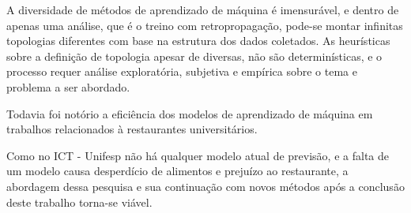 \documentclass[	12pt, Times, openright, twoside, a4paper, english, brazil]{abntex2}
\begin{document}
         A diversidade de métodos de aprendizado de máquina é imensurável, e dentro de apenas uma análise, que é o treino com retropropagação, pode-se montar infinitas topologias diferentes com base na estrutura dos dados coletados. 
        As heurísticas sobre a definição de topologia apesar de diversas, não são determinísticas, e o processo requer análise exploratória, subjetiva e empírica sobre o tema e problema a ser abordado.
        
         Todavia foi notório a eficiência dos modelos de aprendizado de máquina em trabalhos relacionados à restaurantes universitários. 
        
         Como no ICT - Unifesp não há qualquer modelo atual de previsão, e a falta de um modelo causa desperdício de alimentos e prejuízo ao restaurante, a abordagem dessa pesquisa e sua continuação com novos métodos após a conclusão deste trabalho torna-se viável.






\end{document}
